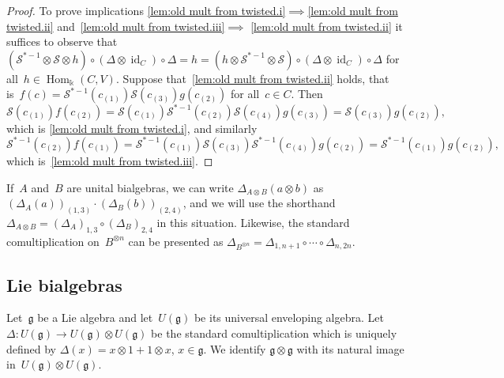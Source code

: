 \documentclass[12pt, reqno]{amsart}
\theoremstyle{definition}
\numberwithin{equation}{section}
\newcommand{\tensor}{\otimes}
\newcommand{\kk}{\mathbb{k}}\newcommand{\lie}[1]{{\mathfrak{#1}}}
\DeclareMathOperator{\id}{id}
\DeclareMathOperator{\Hom}{Hom}
\begin{document}
\begin{proof}
To prove implications \ref{lem:old mult from twisted.i}$\implies$\ref{lem:old mult from twisted.ii}
and~\ref{lem:old mult from twisted.iii}$\implies$
\ref{lem:old mult from twisted.ii} 
it suffices to observe that~$(\mathcal S^{\ast-1}\tensor\mathcal S\tensor h)\circ(\Delta\tensor\id_C)
\circ\Delta=h=(h\tensor \mathcal S^{\ast-1}\tensor 
\mathcal S)\circ(\Delta\tensor\id_C)\circ\Delta$
for all~$h\in\Hom_\kk(C,V)$.
Suppose that~\ref{lem:old mult from twisted.ii} holds,
that is~$f(c)=\mathcal S^{\ast-1}(c_{(1)})\mathcal S(c_{(3)})g(c_{(2)})$
for all~$c\in C$. Then
$$
\mathcal S(c_{(1)})f(c_{(2)})
=\mathcal S(c_{(1)})\mathcal S^{\ast-1}(c_{(2)})
\mathcal S(c_{(4)})g(c_{(3)})
=\mathcal S(c_{(3)})g(c_{(2)}),
$$
which is \ref{lem:old mult from twisted.i}, and
similarly
\begin{equation*}
\mathcal S^{\ast-1}(c_{(2)})f(c_{(1)})
=\mathcal S^{\ast-1}(c_{(1)})\mathcal S(c_{(3)})
\mathcal S^{\ast-1}(c_{(4)})g(c_{(2)})
=\mathcal S^{\ast-1}(c_{(1)})g(c_{(2)}),
\end{equation*}
which is~\ref{lem:old mult from twisted.iii}.
\end{proof}


If~$A$ and~$B$ are unital bialgebras, we can write
$\Delta_{A\tensor B}(a\tensor b)$ as $(\Delta_A(a))_{(1,3)}\cdot  (\Delta_B(b))_{(2,4)}$, and we will use the shorthand 
$\Delta_{A\tensor B}=(\Delta_A)_{1,3}\circ(\Delta_B)_{2,4}$ in this 
situation. Likewise, the standard comultiplication on~$B^{\tensor n}$ can be presented as $\Delta_{B^{\tensor n}}=\Delta_{1,n+1}\circ\cdots\circ \Delta_{n,2n}$. 




\subsection{Lie bialgebras}
Let~$\lie g$ be a Lie algebra and let~$U(\lie g)$ be its universal enveloping algebra. Let~$\Delta:U(\lie g)\to U(\lie g)\tensor U(\lie g)$ be the standard 
comultiplication which is uniquely defined by $\Delta(x)=x\tensor 1+1\tensor x$, $x\in\lie g$. We identify $\lie g\tensor \lie g$ with its natural image in~$U(\lie g)\tensor U(\lie g)$.
\end{document}
